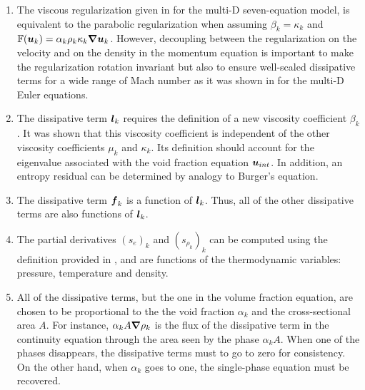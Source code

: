 \begin{enumerate}
\item {The viscous regularization given in  for the multi-D seven-equation model, is equivalent to the parabolic regularization \cite{Parabolic} when assuming $\beta_k = \kappa_k$ and $\mathbb{F}(\boldsymbol u_k) = \alpha_k \rho_k \kappa_k \boldsymbol{\nabla} \boldsymbol u_k$. However, decoupling between the regularization on the velocity and on the density in the momentum equation is important to make the regularization rotation invariant but also to ensure well-scaled dissipative terms for a wide range of Mach number as it was shown in  for the multi-D Euler equations.}
\item {The dissipative term $\boldsymbol l_k$ requires the definition of a new viscosity
    coefficient $\beta_k$. It was shown that this viscosity coefficient is independent of
    the other viscosity coefficients $\mu_k$ and $\kappa_k$. Its definition should
    account for the eigenvalue associated with the void fraction equation $\boldsymbol u_{int}$.
    In addition, an entropy residual can be determined by analogy to Burger's
    equation. }

\item {The dissipative term $\boldsymbol f_k$ is a function of $\boldsymbol l_k$. Thus, all of the other
    dissipative terms are also functions of $\boldsymbol l_k$.}

\item {The partial derivatives $(s_e)_k$ and $(s_{\rho_k})_k$ can be computed using the
    definition provided in , and are functions of the thermodynamic
    variables: pressure, temperature and density.}

\item {All of the dissipative terms, but the one in the volume fraction equation, are chosen to be proportional to the the void
    fraction $\alpha_k$ and the cross-sectional area $A$. For instance, $\alpha_k A \boldsymbol{\nabla} \rho_k$ is the
    flux of the dissipative term in the continuity equation through the area seen
    by the phase $\alpha_k A$. When one of the phases disappears, the dissipative terms
    must to go to zero for consistency. On the other hand, when $\alpha_k$ goes to one,
    the single-phase equation must be recovered. }
    

\end{enumerate}
